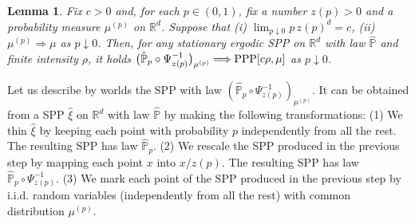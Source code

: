 \documentclass[12pt,a4paper,reqno]{amsart}
\newtheorem{Lemma}[Theorem]{Lemma}
\newcommand{\bbP}{{\ensuremath{\mathbb P}} }
\newcommand{\bbR}{{\ensuremath{\mathbb R}} }
\newcommand{\da}{\downarrow}
\begin{document}
\begin{Lemma}\label{la_bomba}
Fix $c>0$ and, for each $p\in (0,1)$, fix a number $z(p)>0$ and  a probability measure $\mu^{(p)}$ on $\bbR^d$. Suppose that 
(i)  $\lim_{p\da 0} p\, z(p)^d=c$, 
(ii) $\mu^{(p)}\Rightarrow  \mu$ as $p \downarrow 0$.
Then, for any  stationary  ergodic   SPP  on $\bbR^d$ with law $\hat \bbP$ and finite  intensity $\rho$,  it holds 
$
\bigl( \hat \bbP_p \circ \Psi_{z(p)}  ^{-1}\bigr)_{\mu^{(p)}} \Longrightarrow {\rm PPP}[c \rho, \mu]$ as $p\downarrow 0$.
\end{Lemma}
Let us describe  by worlds the SPP with law $( \hat \bbP_p \circ \Psi_{z(p)}  ^{-1})_{\mu^{(p)}}$. It can be obtained from  a SPP $\hat \xi$ on $\bbR^d$  with law $\hat\bbP$ by  making the following transformations: 
(1) We thin $\hat \xi$ by  keeping each point with probability $p$ independently from all the rest. The resulting SPP has law $\hat \bbP_p $.
(2)  We rescale the SPP  produced in the previous step by mapping each point $x$ into $x/z(p)$. The resulting SPP has law $\hat \bbP_p \circ \Psi_{z(p)}  ^{-1}$.
(3)  We mark each point of the SPP  produced in the previous step by i.i.d. random variables  (independently from all the rest) with common distribution $\mu^{(p)}$.
\end{document}
